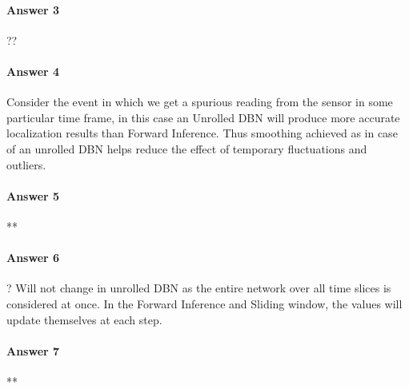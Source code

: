 \documentclass[12pt]{article}
\begin{document}
\paragraph{Answer 3} ??

\paragraph{Answer 4}
Consider the event in which we get a spurious reading from the sensor in some particular time frame, in this case an Unrolled DBN will produce more accurate localization results than Forward Inference. Thus smoothing achieved as in case of an unrolled DBN helps reduce the effect of temporary fluctuations and outliers.
 
\paragraph{Answer 5} **

\paragraph{Answer 6} ? Will not change in unrolled DBN as the entire network over all time slices is considered at once. In the Forward Inference and Sliding window, the values will update themselves at each step.

\paragraph{Answer 7} **
\end{document}
